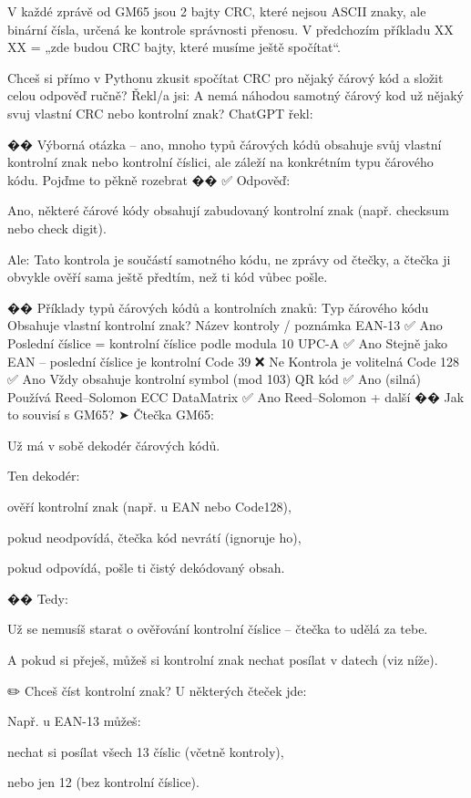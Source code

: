     V každé zprávě od GM65 jsou 2 bajty CRC, které nejsou ASCII znaky, ale binární čísla, určená ke kontrole správnosti přenosu.
    V předchozím příkladu XX XX = „zde budou CRC bajty, které musíme ještě spočítat“.

Chceš si přímo v Pythonu zkusit spočítat CRC pro nějaký čárový kód a složit celou odpověď ručně?
Řekl/a jsi:
A nemá náhodou samotný čárový kod už nějaký svuj vlastní CRC nebo kontrolní znak?
ChatGPT řekl:

�� Výborná otázka – ano, mnoho typů čárových kódů obsahuje svůj vlastní kontrolní znak nebo kontrolní číslici, ale záleží na konkrétním typu čárového kódu. Pojďme to pěkně rozebrat ��
✅ Odpověď:

    Ano, některé čárové kódy obsahují zabudovaný kontrolní znak (např. checksum nebo check digit).

    Ale:
    Tato kontrola je součástí samotného kódu, ne zprávy od čtečky, a čtečka ji obvykle ověří sama ještě předtím, než ti kód vůbec pošle.

�� Příklady typů čárových kódů a kontrolních znaků:
Typ čárového kódu	Obsahuje vlastní kontrolní znak?	Název kontroly / poznámka
EAN-13	✅ Ano	Poslední číslice = kontrolní číslice podle modula 10
UPC-A	✅ Ano	Stejně jako EAN – poslední číslice je kontrolní
Code 39	❌ Ne	Kontrola je volitelná
Code 128	✅ Ano	Vždy obsahuje kontrolní symbol (mod 103)
QR kód	✅ Ano (silná)	Používá Reed–Solomon ECC
DataMatrix	✅ Ano	Reed–Solomon + další
�� Jak to souvisí s GM65?
➤ Čtečka GM65:

    Už má v sobě dekodér čárových kódů.

    Ten dekodér:

        ověří kontrolní znak (např. u EAN nebo Code128),

        pokud neodpovídá, čtečka kód nevrátí (ignoruje ho),

        pokud odpovídá, pošle ti čistý dekódovaný obsah.

�� Tedy:

    Už se nemusíš starat o ověřování kontrolní číslice – čtečka to udělá za tebe.

    A pokud si přeješ, můžeš si kontrolní znak nechat posílat v datech (viz níže).

✏️ Chceš číst kontrolní znak? U některých čteček jde:

Např. u EAN-13 můžeš:

    nechat si posílat všech 13 číslic (včetně kontroly),

    nebo jen 12 (bez kontrolní číslice).

